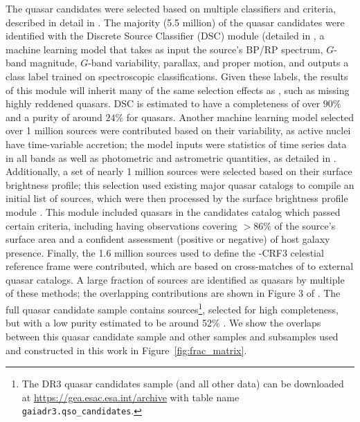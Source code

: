 The quasar candidates were selected based on multiple classifiers and criteria, described in detail in \cite{gaia_collaboration_gaia_2023}.
The majority (5.5 million) of the quasar candidates were identified with the Discrete Source Classifier (DSC) module (detailed in \cite{delchambre_gaia_2023}, a machine learning model that takes as input the source's BP/RP spectrum, $G$-band magnitude, $G$-band variability, parallax, and proper motion, and outputs a class label trained on \SDSS spectroscopic classifications.
Given these \SDSS labels, the results of this module will inherit many of the same selection effects as \SDSS, such as missing highly reddened quasars.
DSC is estimated to have a completeness of over $90\%$ and a purity of around $24\%$ for quasars.
Another machine learning model selected over 1 million sources were contributed based on their variability, as active nuclei have time-variable accretion; the model inputs were statistics of time series data in all \Gaia bands as well as photometric and astrometric quantities, as detailed in \cite{rimoldini_gaia_2023}. 
Additionally, a set of nearly 1 million sources were selected based on their surface brightness profile; this selection used existing major quasar catalogs to compile an initial list of sources, which were then processed by the \Gaia surface brightness profile module \cite{ducourant_gaia_2022}.
This module included quasars in the candidates catalog which passed certain criteria, including having \Gaia observations covering $>86\%$ of the source's surface area and a confident assessment (positive or negative) of host galaxy presence.
Finally, the 1.6 million sources used to define the \Gaia-CRF3 celestial reference frame were contributed, which are based on cross-matches of \Gaia to external quasar catalogs.
A large fraction of sources are identified as quasars by multiple of these methods; the overlapping contributions are shown in Figure 3 of \cite{gaia_collaboration_gaia_2023}.
The full quasar candidate sample contains  sources\footnote{The \Gaia DR3 quasar candidates sample (and all other \Gaia data) can be downloaded at \url{https://gea.esac.esa.int/archive} with table name \texttt{gaiadr3.qso\_candidates}.}, selected for high completeness, but with a low purity estimated to be around 52\% \citep{gaia_collaboration_gaia_2023}.
We show the overlaps between this \Gaia quasar candidate sample and other samples and subsamples used and constructed in this work in Figure~\ref{fig:frac_matrix}.

